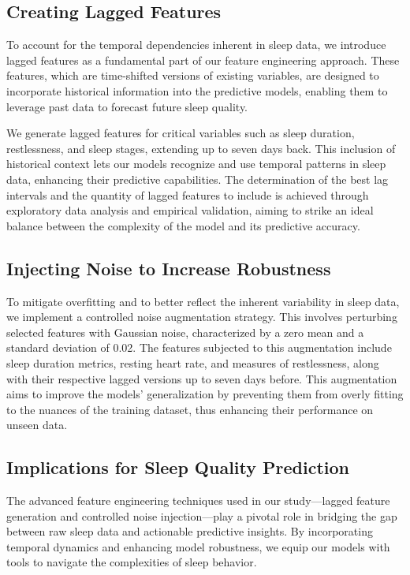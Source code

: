 \documentclass[10pt]{extarticle}
\begin{document}
\subsection{Creating Lagged Features}

To account for the temporal dependencies inherent in sleep data, we introduce lagged features as a fundamental part of our feature engineering approach. These features, which are time-shifted versions of existing variables, are designed to incorporate historical information into the predictive models, enabling them to leverage past data to forecast future sleep quality.

We generate lagged features for critical variables such as sleep duration, restlessness, and sleep stages, extending up to seven days back. This inclusion of historical context lets our models recognize and use temporal patterns in sleep data, enhancing their predictive capabilities. The determination of the best lag intervals and the quantity of lagged features to include is achieved through exploratory data analysis and empirical validation, aiming to strike an ideal balance between the complexity of the model and its predictive accuracy.

\subsection{Injecting Noise to Increase Robustness}

To mitigate overfitting and to better reflect the inherent variability in sleep data, we implement a controlled noise augmentation strategy. This involves perturbing selected features with Gaussian noise, characterized by a zero mean and a standard deviation of 0.02. The features subjected to this augmentation include sleep duration metrics, resting heart rate, and measures of restlessness, along with their respective lagged versions up to seven days before. This augmentation aims to improve the models' generalization by preventing them from overly fitting to the nuances of the training dataset, thus enhancing their performance on unseen data.

\subsection{Implications for Sleep Quality Prediction}

The advanced feature engineering techniques used in our study—lagged feature generation and controlled noise injection—play a pivotal role in bridging the gap between raw sleep data and actionable predictive insights. By incorporating temporal dynamics and enhancing model robustness, we equip our models with tools to navigate the complexities of sleep behavior.
\end{document}
